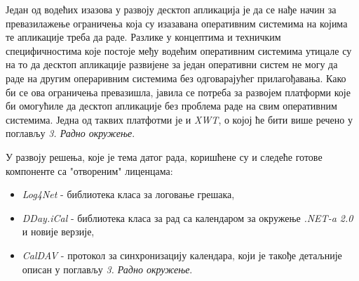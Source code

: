 Један од водећих изазова у развоју десктоп апликација је да се нађе начин за превазилажење ограничења која су изазавана оперативним системима на којима те апликације треба да раде. Разлике у концептима и техничким специфичностима које постоје међу водећим оперативним системима утицале су на то да десктоп апликације развијене за један оперативни систем не могу да раде на другим операривним системима без одговарајућег прилагођавања. Како би се ова ограничења превазишла, јавила се потреба за развојем платформи које би омогућиле да десктоп апликације без проблема раде на свим оперативним системима. Једна од таквих платфотми је и \textit{XWT}\cite{xwt}, о којој ће бити више речено у поглављу \textit{3. Радно окружење}.

У развоју решења, које је тема датог рада, коришћене су и следеће готове компоненте са "отвореним" лиценцама:
\begin{itemize}
	\item {\textit{Log4Net} - библиотека класа за логовање грешака},
	\item {\textit{DDay.iCal}\cite{dday} - библиотека класа за рад са календаром за окружење \textit{.NET-a 2.0} и новије верзије},
	\item {\textit{CalDAV}\cite{caldav} - протокол за синхронизацију календара, који је такође детаљније описан у поглављу \textit{3. Радно окружење}}.
\end{itemize}